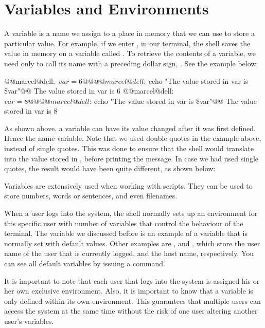 \section{Variables and Environments}

A variable is a name we assign to a place in memory that we can use to store a particular value. For example, if we enter , in our terminal, the shell saves the value  in memory on a variable called . To retrieve the contents of a variable, we need only to call its name with a preceding dollar sign, \mycommand{\$}. See the example below:

\begin{command_line}[Make]
@@marcel@dell:~$var=6@@
@@marcel@dell:~$echo "The value stored in var is \$var"@@
The value stored in var is 6
@@marcel@dell:~$var=8@@
@@marcel@dell:~$echo "The value stored in var is \$var"@@
The value stored in var is 8
\end{command_line}

As shown above, a variable can have its value changed after it was first defined. Hence the name variable. Note that we used double quotes in the example above, instead of single quotes. This was done to ensure that the shell would translate  into the value stored in , before printing the message. In case we had used single quotes, the result would have been quite different, as shown below:


Variables are extensively used when working with scripts. They can be used to store numbers, words or sentences, and even filenames.

When a user logs into the system, the shell normally sets up an environment for this specific user with number of variables that control the behaviour of the terminal. The  variable we discussed before is an example of a variable that is normally set with default values. Other examples are , and , which store the user name of the user that is currently logged, and the host name, respectively. You can see all default variables by issuing a  command.

It is important to note that each user that logs into the system is assigned his or her own exclusive environment. Also, it is important to know that a variable is only defined within its own environment. This guarantees that multiple users can access the system at the same time without the risk of one user altering another user's variables.


